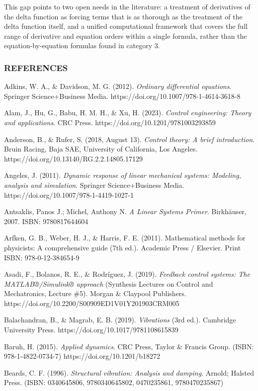 \documentclass[
  11pt,
]{article}
\begin{document}
This gap points to two open needs in the literature: a treatment of
derivatives of the delta function as forcing terms that is as thorough
as the treatment of the delta function itself, and a unified
computational framework that covers the full range of derivative and
equation orders within a single formula, rather than the
equation-by-equation formulas found in category 3.

\hypertarget{references}{%
\subsubsection{REFERENCES}\label{references}}

Adkins, W. A., \& Davidson, M. G. (2012). \emph{Ordinary differential
equations}. Springer Science+Business Media.
https://doi.org/10.1007/978-1-4614-3618-8

Alam, J., Hu, G., Babu, H. M. H., \& Xu, H. (2023). \emph{Control
engineering: Theory and applications}. CRC Press.
https://doi.org/10.1201/9781003293859

Anderson, B., \& Rufer, S. (2018, August 13). \emph{Control theory: A
brief introduction}. Bruin Racing, Baja SAE, University of California,
Los Angeles. https://doi.org/10.13140/RG.2.2.14805.17129

Angeles, J. (2011). \emph{Dynamic response of linear mechanical systems:
Modeling, analysis and simulation}. Springer Science+Business Media.
https://doi.org/10.1007/978-1-4419-1027-1

Antsaklis, Panos J.; Michel, Anthony N. \emph{A Linear Systems Primer}.
Birkhäuser, 2007. ISBN: 9780817644604

Arfken, G. B., Weber, H. J., \& Harris, F. E. (2011). Mathematical
methods for physicists: A comprehensive guide (7th ed.). Academic Press
/ Elsevier. Print ISBN: 978-0-12-384654-9

Asadi, F., Bolanos, R. E., \& Rodríguez, J. (2019). \emph{Feedback
control systems: The MATLAB®/Simulink® approach} (Synthesis Lectures on
Control and Mechatronics, Lecture \#5). Morgan \& Claypool Publishers.
https://doi.org/10.2200/S00909ED1V01Y201903CRM005

Balachandran, B., \& Magrab, E. B. (2019). \emph{Vibrations} (3rd ed.).
Cambridge University Press. https://doi.org/10.1017/9781108615839

Baruh, H. (2015). \emph{Applied dynamics}. CRC Press, Taylor \& Francis
Group. (ISBN: 978-1-4822-0734-7) https://doi.org/10.1201/b18272

Beards, C. F. (1996). \emph{Structural vibration: Analysis and damping}.
Arnold; Halsted Press. (ISBN: 0340645806, 9780340645802, 0470235861,
9780470235867)
\end{document}
